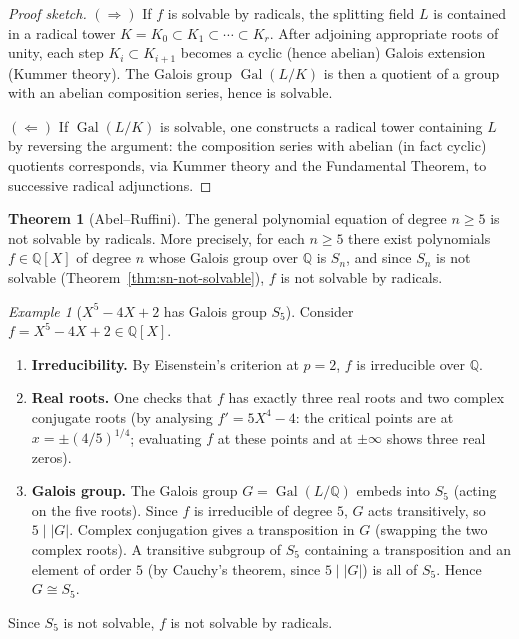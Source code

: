 \documentclass[12pt,a4paper,openany]{book}
\theoremstyle{definition}
\newtheorem{theorem}{Theorem}[chapter]
\theoremstyle{remark}
\newtheorem{example}{Example}[chapter]
\newcommand{\Q}{\mathbb{Q}}
\DeclareMathOperator{\Gal}{Gal}
\begin{document}
\begin{proof}[Proof sketch]
$(\Longrightarrow)$\;
If $f$ is solvable by radicals, the splitting field $L$ is contained in a
radical tower $K=K_{0}\subset K_{1}\subset\cdots\subset K_{r}$.  After
adjoining appropriate roots of unity, each step $K_{i}\subset K_{i+1}$
becomes a cyclic (hence abelian) Galois extension (Kummer theory).  The
Galois group $\Gal(L/K)$ is then a quotient of a group with an abelian
composition series, hence is solvable.

$(\Longleftarrow)$\;
If $\Gal(L/K)$ is solvable, one constructs a radical tower containing $L$
by reversing the argument: the composition series with abelian (in fact
cyclic) quotients corresponds, via Kummer theory and the Fundamental Theorem,
to successive radical adjunctions.
\end{proof}

\begin{theorem}[Abel--Ruffini]\label{thm:abel-ruffini}
The general polynomial equation of degree $n\geq 5$ is not solvable by
radicals.  More precisely, for each $n\geq 5$ there exist polynomials
$f\in\Q[X]$ of degree $n$ whose Galois group over $\Q$ is $S_{n}$, and
since $S_{n}$ is not solvable (Theorem~\ref{thm:sn-not-solvable}), $f$ is
not solvable by radicals.
\end{theorem}

\begin{example}[$X^{5}-4X+2$ has Galois group $S_{5}$]\label{ex:x5-s5}
Consider $f=X^{5}-4X+2\in\Q[X]$.

\begin{enumerate}
\item \textbf{Irreducibility.}\; By Eisenstein's criterion at $p=2$, $f$ is
irreducible over $\Q$.

\item \textbf{Real roots.}\; One checks that $f$ has exactly three real
roots and two complex conjugate roots (by analysing $f'=5X^{4}-4$: the
critical points are at $x=\pm(4/5)^{1/4}$; evaluating $f$ at these points
and at $\pm\infty$ shows three real zeros).

\item \textbf{Galois group.}\; The Galois group $G=\Gal(L/\Q)$ embeds into
$S_{5}$ (acting on the five roots).  Since $f$ is irreducible of degree $5$,
$G$ acts transitively, so $5\mid|G|$.  Complex conjugation gives a
transposition in $G$ (swapping the two complex roots).  A transitive
subgroup of $S_{5}$ containing a transposition and an element of order $5$
(by Cauchy's theorem, since $5\mid|G|$) is all of $S_{5}$.  Hence
$G\cong S_{5}$.
\end{enumerate}

Since $S_{5}$ is not solvable, $f$ is not solvable by radicals.
\end{example}
\end{document}
